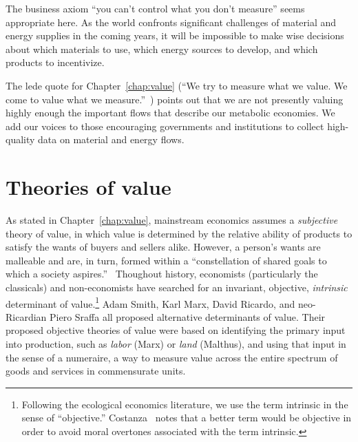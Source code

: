 The business axiom ``you can't control what you don't measure''
seems appropriate here. 
As the world confronts significant challenges
of material and energy supplies in the coming years,
it will be impossible to make wise decisions about
which materials to use,
which energy sources to develop, and 
which products to incentivize.

The lede quote for Chapter~\ref{chap:value}
(``We try to measure what we value. 
We come to value what we measure.''~\cite[p.~2]{Meadows:1998aa})
points out that we are not presently valuing highly enough
the important flows that describe our metabolic economies.
We add our voices to those encouraging governments and 
institutions to collect high-quality data on material 
and energy flows.


\section{Theories of value}
\label{sec:theory_of_value}

As stated in Chapter~\ref{chap:value}, mainstream economics assumes a
\emph{subjective} theory of value, 
in which value is determined by the relative ability 
of products to satisfy the wants of buyers and sellers alike.
However, a person's wants are malleable and are, in turn, formed within a 
``constellation of shared goals to which a society aspires.''~\cite{Costanza:2004we}
Thoughout history, economists (particularly the classicals) 
and non-economists have searched for an invariant, objective, 
\emph{intrinsic} determinant of value.\footnote{Following the ecological economics literature, 
	we use the term intrinsic in the sense of ``objective.'' Costanza~\cite{Costanza:2004we} 
	notes that a better term would be objective in order to avoid moral overtones associated 
	with the term intrinsic.} 
Adam Smith, Karl Marx, David Ricardo, and neo-Ricardian Piero Sraffa all proposed 
alternative determinants of value.  
Their proposed objective theories of value were based 
on identifying the primary input into production,
such as \emph{labor} (Marx) or \emph{land} (Malthus), 
and using that input in the sense of a numeraire, 
a way to measure value across the entire spectrum 
of goods and services in commensurate units.

